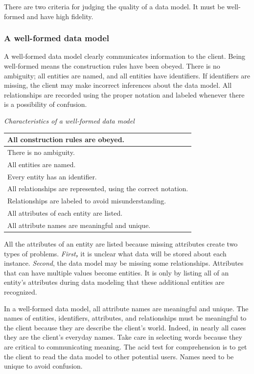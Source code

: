 \documentclass[
]{article}
\begin{document}
There are two criteria for judging the quality of a data model. It must
be well-formed and have high fidelity.

\hypertarget{a-well-formed-data-model}{%
\subsubsection*{A well-formed data model}\label{a-well-formed-data-model}}

A well-formed data model clearly communicates information to the client.
Being well-formed means the construction rules have been obeyed. There
is no ambiguity; all entities are named, and all entities have
identifiers. If identifiers are missing, the client may make incorrect
inferences about the data model. All relationships are recorded using
the proper notation and labeled whenever there is a possibility of
confusion.

\emph{Characteristics of a well-formed data model}

\begin{longtable}[]{@{}l@{}}
\toprule
All construction rules are obeyed. \\
\midrule
\endhead
There is no ambiguity. \\
All entities are named. \\
Every entity has an identifier. \\
All relationships are represented, using the correct notation. \\
Relationships are labeled to avoid misunderstanding. \\
All attributes of each entity are listed. \\
All attribute names are meaningful and unique. \\
\bottomrule
\end{longtable}

All the attributes of an entity are listed because missing attributes
create two types of problems. \emph{First\textbf{,}} it is unclear what data will
be stored about each instance. \emph{Second}, the data model may be missing
some relationships. Attributes that can have multiple values become
entities. It is only by listing all of an entity's attributes during
data modeling that these additional entities are recognized.

In a well-formed data model, all attribute names are meaningful and
unique. The names of entities, identifiers, attributes, and
relationships must be meaningful to the client because they are describe
the client's world. Indeed, in nearly all cases they are the client's
everyday names. Take care in selecting words because they are critical
to communicating meaning. The acid test for comprehension is to get the
client to read the data model to other potential users. Names need to be
unique to avoid confusion.
\end{document}
